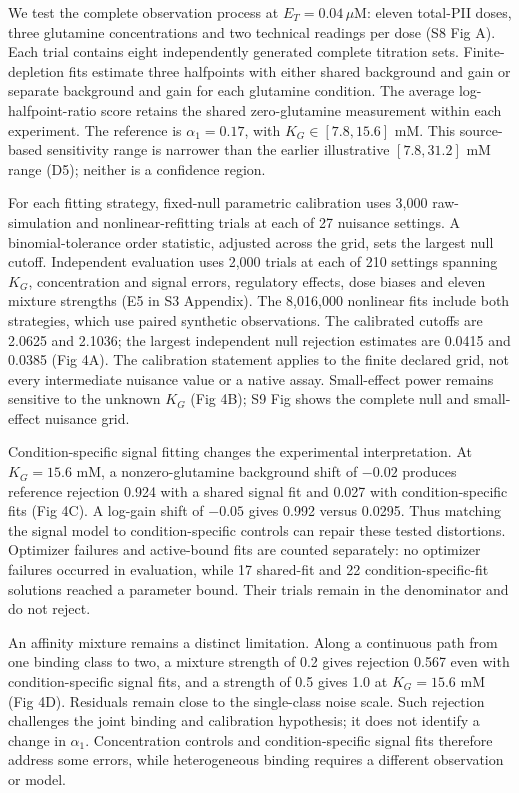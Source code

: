\documentclass[10pt,letterpaper]{article}
\begin{document}
We test the complete observation process at $E_T=0.04\,\mu$M: eleven total-PII doses, three glutamine concentrations and two technical readings per dose (S8 Fig A). Each trial contains eight independently generated complete titration sets. Finite-depletion fits estimate three halfpoints with either shared background and gain or separate background and gain for each glutamine condition. The average log-halfpoint-ratio score retains the shared zero-glutamine measurement within each experiment. The reference is $\alpha_1=0.17$, with $K_G\in[7.8,15.6]$ mM. This source-based sensitivity range is narrower than the earlier illustrative $[7.8,31.2]$ mM range (D5); neither is a confidence region.

For each fitting strategy, fixed-null parametric calibration uses 3,000 raw-simulation and nonlinear-refitting trials at each of 27 nuisance settings. A binomial-tolerance order statistic, adjusted across the grid, sets the largest null cutoff. Independent evaluation uses 2,000 trials at each of 210 settings spanning $K_G$, concentration and signal errors, regulatory effects, dose biases and eleven mixture strengths (E5 in S3 Appendix). The 8,016,000 nonlinear fits include both strategies, which use paired synthetic observations. The calibrated cutoffs are 2.0625 and 2.1036; the largest independent null rejection estimates are 0.0415 and 0.0385 (Fig 4A). The calibration statement applies to the finite declared grid, not every intermediate nuisance value or a native assay. Small-effect power remains sensitive to the unknown $K_G$ (Fig 4B); S9 Fig shows the complete null and small-effect nuisance grid.

Condition-specific signal fitting changes the experimental interpretation. At $K_G=15.6$ mM, a nonzero-glutamine background shift of $-0.02$ produces reference rejection 0.924 with a shared signal fit and 0.027 with condition-specific fits (Fig 4C). A log-gain shift of $-0.05$ gives 0.992 versus 0.0295. Thus matching the signal model to condition-specific controls can repair these tested distortions. Optimizer failures and active-bound fits are counted separately: no optimizer failures occurred in evaluation, while 17 shared-fit and 22 condition-specific-fit solutions reached a parameter bound. Their trials remain in the denominator and do not reject.

An affinity mixture remains a distinct limitation. Along a continuous path from one binding class to two, a mixture strength of 0.2 gives rejection 0.567 even with condition-specific signal fits, and a strength of 0.5 gives 1.0 at $K_G=15.6$ mM (Fig 4D). Residuals remain close to the single-class noise scale. Such rejection challenges the joint binding and calibration hypothesis; it does not identify a change in $\alpha_1$. Concentration controls and condition-specific signal fits therefore address some errors, while heterogeneous binding requires a different observation or model.
\end{document}
